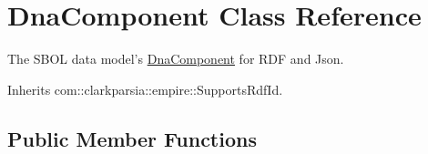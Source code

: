 \hypertarget{classorg_1_1sbolstandard_1_1lib_s_b_o_lj_1_1_dna_component}{
\section{DnaComponent Class Reference}
\label{classorg_1_1sbolstandard_1_1lib_s_b_o_lj_1_1_dna_component}
}


The SBOL data model's \hyperlink{classorg_1_1sbolstandard_1_1lib_s_b_o_lj_1_1_dna_component}{DnaComponent} for RDF and Json.  




Inherits com::clarkparsia::empire::SupportsRdfId.

\subsection*{Public Member Functions}
